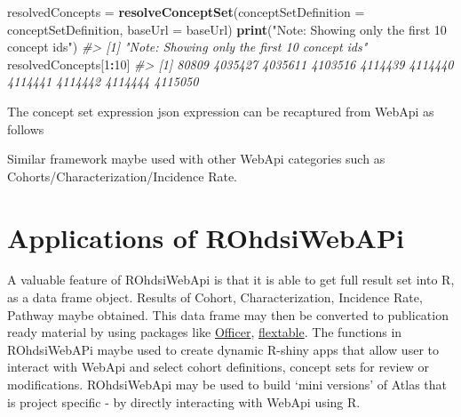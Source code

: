 \documentclass[
]{article}
\newenvironment{Shaded}{\begin{snugshade}}{\end{snugshade}}
\newcommand{\CommentTok}[1]{\textcolor[rgb]{0.56,0.35,0.01}{\textit{#1}}}
\newcommand{\DataTypeTok}[1]{\textcolor[rgb]{0.13,0.29,0.53}{#1}}
\newcommand{\DecValTok}[1]{\textcolor[rgb]{0.00,0.00,0.81}{#1}}
\newcommand{\KeywordTok}[1]{\textcolor[rgb]{0.13,0.29,0.53}{\textbf{#1}}}
\newcommand{\NormalTok}[1]{#1}
\newcommand{\OperatorTok}[1]{\textcolor[rgb]{0.81,0.36,0.00}{\textbf{#1}}}
\newcommand{\OtherTok}[1]{\textcolor[rgb]{0.56,0.35,0.01}{#1}}
\newcommand{\StringTok}[1]{\textcolor[rgb]{0.31,0.60,0.02}{#1}}
\begin{document}
\begin{Shaded}
\begin{Highlighting}[]
\NormalTok{resolvedConcepts =}\StringTok{ }\KeywordTok{resolveConceptSet}\NormalTok{(}\DataTypeTok{conceptSetDefinition =}\NormalTok{ conceptSetDefinition, }\DataTypeTok{baseUrl =}\NormalTok{ baseUrl)}
\KeywordTok{print}\NormalTok{(}\StringTok{"Note: Showing only the first 10 concept id\textquotesingle{}s"}\NormalTok{)}
\CommentTok{\#> [1] "Note: Showing only the first 10 concept id\textquotesingle{}s"}
\NormalTok{resolvedConcepts[}\DecValTok{1}\OperatorTok{:}\DecValTok{10}\NormalTok{]}
\CommentTok{\#>  [1]   80809 4035427 4035611 4103516 4114439 4114440 4114441 4114442 4114444 4115050}
\end{Highlighting}
\end{Shaded}

The concept set expression json expression can be recaptured from WebApi
as follows

\begin{Shaded}
\end{Shaded}

Similar framework maybe used with other WebApi categories such as
Cohorts/Characterization/Incidence Rate.

\hypertarget{applications-of-rohdsiwebapi}{%
\section{Applications of
ROhdsiWebAPi}\label{applications-of-rohdsiwebapi}}

A valuable feature of ROhdsiWebApi is that it is able to get full result
set into R, as a data frame object. Results of Cohort, Characterization,
Incidence Rate, Pathway maybe obtained. This data frame may then be
converted to publication ready material by using packages like
\href{https://davidgohel.github.io/officer/}{Officer},
\href{https://davidgohel.github.io/flextable/}{flextable}. The functions
in ROhdsiWebAPi maybe used to create dynamic R-shiny apps that allow
user to interact with WebApi and select cohort definitions, concept sets
for review or modifications. ROhdsiWebApi may be used to build `mini
versions' of Atlas that is project specific - by directly interacting
with WebApi using R.
\end{document}
